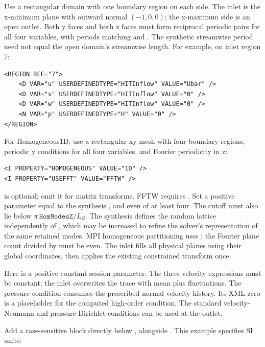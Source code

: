 Use a rectangular domain with one boundary region on each side. The inlet is
the x-minimum plane with outward normal $(-1,0,0)$; the x-maximum side is an
open outlet. Both y faces and both z faces must form reciprocal periodic pairs
for all four variables, with periods matching  and .
The synthetic streamwise period  need not equal the open domain's
streamwise length. For example, on inlet region 7:

\begin{lstlisting}[style=XMLStyle]
<REGION REF="7">
    <D VAR="u" USERDEFINEDTYPE="HITInflow" VALUE="Ubar" />
    <D VAR="v" USERDEFINEDTYPE="HITInflow" VALUE="0" />
    <D VAR="w" USERDEFINEDTYPE="HITInflow" VALUE="0" />
    <N VAR="p" USERDEFINEDTYPE="H" VALUE="0" />
</REGION>
\end{lstlisting}

For Homogeneous1D, use a rectangular xy mesh with four boundary regions,
periodic y conditions for all four variables, and Fourier periodicity in z:
\begin{lstlisting}[style=XMLStyle]
<I PROPERTY="HOMOGENEOUS" VALUE="1D" />
<I PROPERTY="USEFFT" VALUE="FFTW" />
\end{lstlisting}
 is optional; omit it for matrix transforms. FFTW requires
. Set a positive  parameter equal to
the synthesis , and even  of at least four. The
cutoff must also lie below $\pi\,\mathtt{HomModesZ}/L_Z$. The synthesis
 defines the random lattice independently of ,
which may be increased to refine the solver's representation of the same
retained modes. MPI homogeneous
partitioning uses ; the Fourier plane count divided by
 must be even. The inlet fills all physical planes using their
global coordinates, then applies the existing constrained transform once.

Here  is a positive constant session parameter. The three velocity
expressions must be constant; the inlet overwrites the trace with mean plus
fluctuations. The pressure  condition consumes the prescribed
normal-velocity history. Its XML zero is a placeholder for the computed
high-order condition. The standard  velocity-Neumann and
pressure-Dirichlet conditions can be used at the outlet.

Add a case-sensitive  block directly below ,
alongside . This example specifies SI units:

